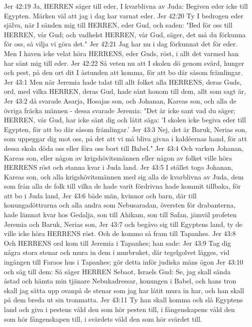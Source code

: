 Jer 42:19  Ja, HERREN säger till eder, I kvarblivna av Juda: Begiven eder icke till Egypten. Märken väl att jag i dag har varnat eder.
Jer 42:20  Ty I bedrogen eder själva, när I sänden mig till HERREN, eder Gud, och saden: "Bed för oss till HERREN, vår Gud; och vadhelst HERREN, vår Gud, säger, det må du förkunna för oss, så vilja vi göra det."
Jer 42:21  Jag har nu i dag förkunnat det för eder. Men I haven icke velat höra HERRENS, eder Guds, röst, i allt det varmed han har sänt mig till eder.
Jer 42:22  Så veten nu att I skolen dö genom svärd, hunger och pest, på den ort dit I åstunden att komma, för att bo där såsom främlingar.
Jer 43:1  Men när Jeremia hade talat till allt folket alla HERRENS, deras Guds, ord, med vilka HERREN, deras Gud, hade sänt honom till dem, allt som sagt är,
Jer 43:2  då svarade Asarja, Hosajas son, och Johanan, Kareas son, och alla de övriga fräcka männen - dessa svarade Jeremia: "Det är icke sant vad du säger; HERREN, vår Gud, har icke sänt dig och låtit säga: 'I skolen icke begiva eder till Egypten, för att bo där såsom främlingar.'
Jer 43:3  Nej, det är Baruk, Nerias son, som uppeggar dig mot oss, på det att vi må bliva givna i kaldéernas hand, för att dessa skola döda oss eller föra oss bort till Babel."
Jer 43:4  Och varken Johanan, Kareas son, eller någon av krigshövitsmännen eller någon av folket ville höra HERRENS röst och stanna kvar i Juda land.
Jer 43:5  I stället togo Johanan, Kareas son, och alla krigshövitsmännen med sig alla de kvarblivna av Juda, dem som från alla de folk till vilka de hade varit fördrivna hade kommit tillbaka, för att bo i Juda land,
Jer 43:6  både män, kvinnor och barn, där till konungadöttrarna och alla andra som Nebusaradan, översten för drabanterna, hade lämnat kvar hos Gedalja, son till Ahikam, son till Safan, jämväl profeten Jeremia och Baruk, Nerias son,
Jer 43:7  och begåvo sig till Egyptens land, ty de ville icke höra HERRENS röst. Och de kommo så fram till Tapanhes.
Jer 43:8  Och HERRENS ord kom till Jeremia i Tapanhes; han sade:
Jer 43:9  Tag dig några stora stenar och mura in dem i murbruket, där tegelgolvet lägges, vid ingången till Faraos hus i Tapanhes; gör detta inför judiska mäns ögon
Jer 43:10  och säg till dem: Så säger HERREN Sebaot, Israels Gud: Se, jag skall sända åstad och hämta min tjänare Nebukadressar, konungen i Babel, och hans tron skall jag sätta upp ovanpå de stenar som jag har låtit mura in har, och han skall på dem breda ut sin tronmatta.
Jer 43:11  Ty han skall komma och slå Egyptens land och giva i pestens våld den som hör pesten till, i fångenskapens våld den som hör fångenskapen till, i svärdets våld den som hör svärdet till.
